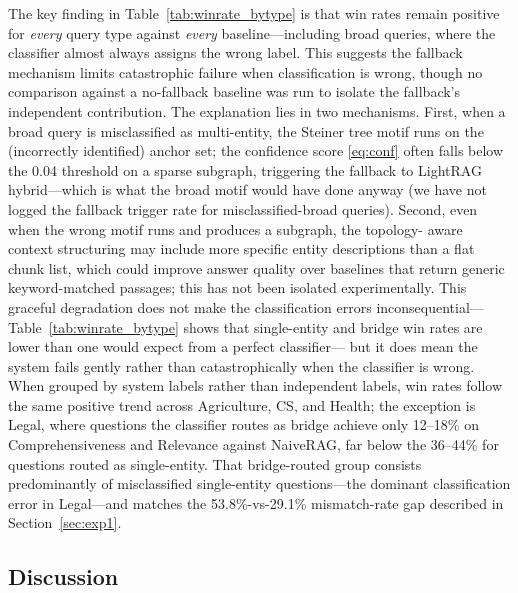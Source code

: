 The key finding in Table~\ref{tab:winrate_bytype} is that win rates remain
positive for \emph{every} query type against \emph{every} baseline---including
broad queries, where the classifier almost always assigns the wrong label.
This suggests the fallback mechanism limits catastrophic failure when
classification is wrong, though no comparison against a no-fallback baseline
was run to isolate the fallback's independent contribution.
The explanation lies in two mechanisms.
First, when a broad query is misclassified as multi-entity, the Steiner tree
motif runs on the (incorrectly identified) anchor set; the confidence score
\eqref{eq:conf} often falls below the 0.04 threshold on a sparse subgraph,
triggering the fallback to LightRAG hybrid---which is what the broad motif
would have done anyway (we have not logged the fallback trigger rate for
misclassified-broad queries).
Second, even when the wrong motif runs and produces a subgraph, the topology-
aware context structuring may include more specific entity descriptions than a
flat chunk list, which could improve answer quality over baselines that return
generic keyword-matched passages; this has not been isolated experimentally.
This graceful degradation does not make the classification errors
inconsequential---Table~\ref{tab:winrate_bytype} shows that single-entity and
bridge win rates are lower than one would expect from a perfect classifier---
but it does mean the system fails gently rather than catastrophically when
the classifier is wrong.
When grouped by system labels rather than independent labels, win rates follow the
same positive trend across Agriculture, CS, and Health; the exception is
Legal, where questions the classifier routes as bridge achieve only 12--18\%
on Comprehensiveness and Relevance against NaiveRAG, far below the 36--44\%
for questions routed as single-entity.
That bridge-routed group consists predominantly of misclassified single-entity
questions---the dominant classification error in Legal---and matches the
53.8\%-vs-29.1\% mismatch-rate gap described in Section~\ref{sec:exp1}.

\subsection{Discussion}
\label{sec:discussion}

